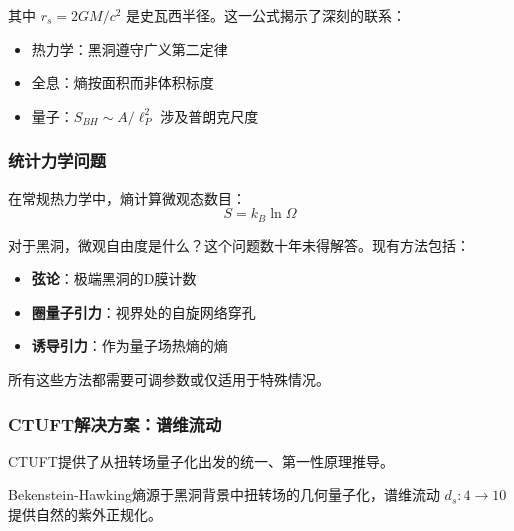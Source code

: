 其中 $r_s = 2GM/c^2$ 是史瓦西半径。这一公式揭示了深刻的联系：
\begin{itemize}
    \item 热力学：黑洞遵守广义第二定律
    \item 全息：熵按面积而非体积标度
    \item 量子：$S_{BH} \sim A/\ell_P^2$ 涉及普朗克尺度
\end{itemize}

\subsubsection{统计力学问题}

在常规热力学中，熵计算微观态数目：
\begin{equation}
    S = k_B \ln \Omega
\end{equation}

对于黑洞，微观自由度是什么？这个问题数十年未得解答。现有方法包括：
\begin{itemize}
    \item \textbf{弦论}：极端黑洞的D膜计数
    \item \textbf{圈量子引力}：视界处的自旋网络穿孔
    \item \textbf{诱导引力}：作为量子场热熵的熵
\end{itemize}

所有这些方法都需要可调参数或仅适用于特殊情况。

\subsubsection{CTUFT解决方案：谱维流动}

CTUFT提供了从扭转场量子化出发的统一、第一性原理推导。

\begin{theorem}[来自扭转场量子化的黑洞熵]
\label{thm:bh_entropy}
Bekenstein-Hawking熵源于黑洞背景中扭转场的几何量子化，谱维流动 $d_s: 4 \to 10$ 提供自然的紫外正规化。
\end{theorem}

